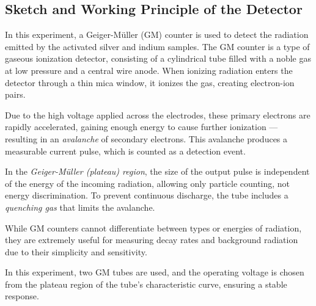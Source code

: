 \documentclass[12pt,a4paper]{article}
\begin{document}
\subsection{Sketch and Working Principle of the Detector}

In this experiment, a Geiger-Müller (GM) counter is used to detect the radiation emitted by the activated silver and indium samples. The GM counter is a type of gaseous ionization detector, consisting of a cylindrical tube filled with a noble gas at low pressure and a central wire anode. When ionizing radiation enters the detector through a thin mica window, it ionizes the gas, creating electron-ion pairs.

Due to the high voltage applied across the electrodes, these primary electrons are rapidly accelerated, gaining enough energy to cause further ionization — resulting in an \textit{avalanche} of secondary electrons. This avalanche produces a measurable current pulse, which is counted as a detection event.

In the \textit{Geiger-Müller (plateau) region}, the size of the output pulse is independent of the energy of the incoming radiation, allowing only particle counting, not energy discrimination. To prevent continuous discharge, the tube includes a \textit{quenching gas} that limits the avalanche.

While GM counters cannot differentiate between types or energies of radiation, they are extremely useful for measuring decay rates and background radiation due to their simplicity and sensitivity.

In this experiment, two GM tubes are used, and the operating voltage is chosen from the plateau region of the tube's characteristic curve, ensuring a stable response.
\end{document}
